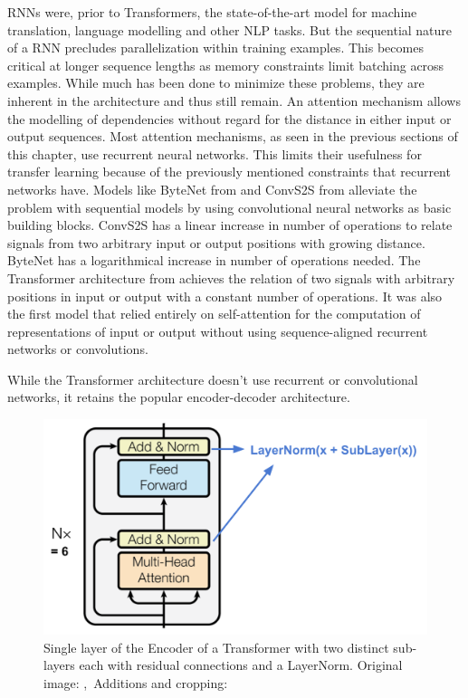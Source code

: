 \documentclass[]{krantz}
\begin{document}
RNNs were, prior to Transformers, the state-of-the-art model for machine translation, language modelling
and other NLP tasks. But the sequential nature of a RNN precludes parallelization within
training examples. This becomes critical at longer sequence lengths as memory constraints
limit batching across examples. While much has been done to minimize these problems,
they are inherent in the architecture and thus still remain. An attention mechanism
allows the modelling of dependencies without regard for the distance in either input
or output sequences. Most attention mechanisms,
as seen in the previous sections of this chapter, use recurrent neural networks.
This limits their usefulness for transfer learning because of the previously mentioned
constraints that recurrent networks have. Models like ByteNet from \citet{kalchbrenner2016neural}
and ConvS2S from \citet{gehring2017convolutional} alleviate the problem with sequential models
by using convolutional neural networks as basic building blocks. ConvS2S has a
linear increase in number of operations to relate signals from two arbitrary
input or output positions with growing distance. ByteNet has a logarithmical increase
in number of operations needed. The Transformer architecture from \citet{vaswani2017attention}
achieves the relation of two signals with arbitrary positions in input or output
with a constant number of operations. It was also the first model that relied entirely
on self-attention for the computation of representations of input or output without
using sequence-aligned recurrent networks or convolutions.

While the Transformer architecture doesn't use recurrent or convolutional networks,
it retains the popular encoder-decoder architecture.

\begin{figure}

{\centering \includegraphics[width=0.6\linewidth]{figures/02-02-attention-and-self-attention-for-nlp/transformer-encoder} 

}

\caption{Single layer of the Encoder of a Transformer with two distinct sub-layers each with residual connections and a LayerNorm. Original image: \citep{vaswani2017attention},\ Additions and cropping: \citep{weng2018attention}}\label{fig:encoder-transformer}
\end{figure}
\end{document}
